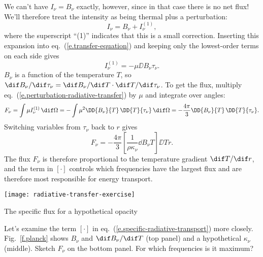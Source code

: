 We can't have $I_{\nu} = B_{\nu}$ exactly, however, since in that case there is no net flux! We'll therefore treat the intensity as being thermal plus a perturbation:
\[ I_{\nu} = B_{\nu} + I_{\nu}^{(1)}, \]
where the superscript ``(1)'' indicates that this is a small correction. Inserting this expansion into eq.~(\ref{e.transfer-equation}) and keeping only the lowest-order terms on each side gives
\begin{equation}\label{e.perturbation-radiative-transfer}
I_{\nu}^{(1)} = -\mu\DD{B_{\nu}}{\tau_{\nu}}.
\end{equation}
$B_{\nu}$ is a function of the temperature $T$, so $\dif B_{\nu}/\dif\tau_{\nu} = \dif B_{\nu}/\dif T \cdot \dif T/\dif \tau_{\nu}$. To get the flux, multiply eq.~(\ref{e.perturbation-radiative-transfer}) by $\mu$ and integrate over angles:
\[ F_{\nu} = \int\mu I_{\nu}^{(1)}\,\dif\Omega = -\int \mu^{2}\DD{B_{\nu}}{T}\,\DD{T}{\tau_{\nu}}\,\dif \Omega = -\frac{4\pi}{3} \DD{B_{\nu}}{T}\,\DD{T}{\tau_{\nu}}. \]
Switching variables from $\tau_{\nu}$ back to $r$ gives
\begin{equation}\label{e.specific-radiative-transport}
	F_{\nu} = -\frac{4\pi}{3}\left[\frac{1}{\rho\kappa_{\nu}}\dd{B_{\nu}}{T}\right]\DD{T}{r}.
\end{equation}
The flux $F_{\nu}$ is therefore proportional to the temperature gradient $\dif T/\dif r$, and
the term in $\left[\cdot\right]$ controls which frequencies have the largest flux and are therefore most responsible for energy transport.

\begin{marginfigure}[-12\baselineskip]
\texttt{[image: radiative-transfer-exercise]}
\caption{\label{f.planck} The specific flux for a hypothetical opacity}
\end{marginfigure}
\begin{exercisebox}
\label{ex.radiative-transfer}
Let's examine the term $\left[\cdot\right]$ in eq.~(\ref{e.specific-radiative-transport}) more closely. Fig.~\ref{f.planck} shows $B_{\nu}$ and $\dif B_{\nu}/\dif T$ (top panel) and a hypothetical $\kappa_{\nu}$ (middle). Sketch $F_{\nu}$ on the bottom panel.  For which frequencies is it maximum?
\end{exercisebox}

